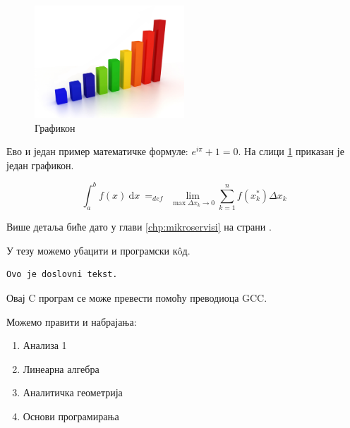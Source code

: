 \documentclass[12pt,oneside]{memoir}
\begin{document}
\begin{figure}[!ht]
  \centering
  \includegraphics[width=0.5\textwidth]{matfmaster/img/graph.png}
  \caption{Графикон}
  \label{fig:grafikon}
\end{figure}

Ево и један пример математичке формуле: $e^{i\pi} + 1 = 0$. 
На слици \ref{fig:grafikon} приказан је један графикон.

$$
\int_a^b f(x)\ \mathrm{d}x \ =_{def}\ \lim_{\max{\Delta x_k \rightarrow 0}} \sum_{k=1}^n f(x_k^*)\Delta x_k
$$

Више детаља биће дато у глави \ref{chp:mikroservisi} на страни \pageref{chp:mikroservisi}.


У тезу можемо убацити и програмски кôд.

\begin{verbatim}
Ovo je doslovni tekst.
\end{verbatim}




Овај C програм се може превести помоћу преводиоца GCC.

Можемо правити и набрајања:
\begin{enumerate}
\item Анализа 1
\item Линеарна алгебра
\item Аналитичка геометрија
\item Основи програмирања
\end{enumerate}
\end{document}
